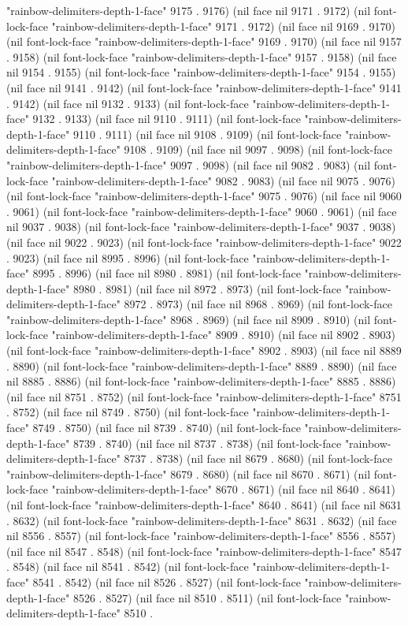 "rainbow-delimiters-depth-1-face" 9175 . 9176) (nil face nil 9171 . 9172) (nil font-lock-face "rainbow-delimiters-depth-1-face" 9171 . 9172) (nil face nil 9169 . 9170) (nil font-lock-face "rainbow-delimiters-depth-1-face" 9169 . 9170) (nil face nil 9157 . 9158) (nil font-lock-face "rainbow-delimiters-depth-1-face" 9157 . 9158) (nil face nil 9154 . 9155) (nil font-lock-face "rainbow-delimiters-depth-1-face" 9154 . 9155) (nil face nil 9141 . 9142) (nil font-lock-face "rainbow-delimiters-depth-1-face" 9141 . 9142) (nil face nil 9132 . 9133) (nil font-lock-face "rainbow-delimiters-depth-1-face" 9132 . 9133) (nil face nil 9110 . 9111) (nil font-lock-face "rainbow-delimiters-depth-1-face" 9110 . 9111) (nil face nil 9108 . 9109) (nil font-lock-face "rainbow-delimiters-depth-1-face" 9108 . 9109) (nil face nil 9097 . 9098) (nil font-lock-face "rainbow-delimiters-depth-1-face" 9097 . 9098) (nil face nil 9082 . 9083) (nil font-lock-face "rainbow-delimiters-depth-1-face" 9082 . 9083) (nil face nil 9075 . 9076) (nil font-lock-face "rainbow-delimiters-depth-1-face" 9075 . 9076) (nil face nil 9060 . 9061) (nil font-lock-face "rainbow-delimiters-depth-1-face" 9060 . 9061) (nil face nil 9037 . 9038) (nil font-lock-face "rainbow-delimiters-depth-1-face" 9037 . 9038) (nil face nil 9022 . 9023) (nil font-lock-face "rainbow-delimiters-depth-1-face" 9022 . 9023) (nil face nil 8995 . 8996) (nil font-lock-face "rainbow-delimiters-depth-1-face" 8995 . 8996) (nil face nil 8980 . 8981) (nil font-lock-face "rainbow-delimiters-depth-1-face" 8980 . 8981) (nil face nil 8972 . 8973) (nil font-lock-face "rainbow-delimiters-depth-1-face" 8972 . 8973) (nil face nil 8968 . 8969) (nil font-lock-face "rainbow-delimiters-depth-1-face" 8968 . 8969) (nil face nil 8909 . 8910) (nil font-lock-face "rainbow-delimiters-depth-1-face" 8909 . 8910) (nil face nil 8902 . 8903) (nil font-lock-face "rainbow-delimiters-depth-1-face" 8902 . 8903) (nil face nil 8889 . 8890) (nil font-lock-face "rainbow-delimiters-depth-1-face" 8889 . 8890) (nil face nil 8885 . 8886) (nil font-lock-face "rainbow-delimiters-depth-1-face" 8885 . 8886) (nil face nil 8751 . 8752) (nil font-lock-face "rainbow-delimiters-depth-1-face" 8751 . 8752) (nil face nil 8749 . 8750) (nil font-lock-face "rainbow-delimiters-depth-1-face" 8749 . 8750) (nil face nil 8739 . 8740) (nil font-lock-face "rainbow-delimiters-depth-1-face" 8739 . 8740) (nil face nil 8737 . 8738) (nil font-lock-face "rainbow-delimiters-depth-1-face" 8737 . 8738) (nil face nil 8679 . 8680) (nil font-lock-face "rainbow-delimiters-depth-1-face" 8679 . 8680) (nil face nil 8670 . 8671) (nil font-lock-face "rainbow-delimiters-depth-1-face" 8670 . 8671) (nil face nil 8640 . 8641) (nil font-lock-face "rainbow-delimiters-depth-1-face" 8640 . 8641) (nil face nil 8631 . 8632) (nil font-lock-face "rainbow-delimiters-depth-1-face" 8631 . 8632) (nil face nil 8556 . 8557) (nil font-lock-face "rainbow-delimiters-depth-1-face" 8556 . 8557) (nil face nil 8547 . 8548) (nil font-lock-face "rainbow-delimiters-depth-1-face" 8547 . 8548) (nil face nil 8541 . 8542) (nil font-lock-face "rainbow-delimiters-depth-1-face" 8541 . 8542) (nil face nil 8526 . 8527) (nil font-lock-face "rainbow-delimiters-depth-1-face" 8526 . 8527) (nil face nil 8510 . 8511) (nil font-lock-face "rainbow-delimiters-depth-1-face" 8510 . 